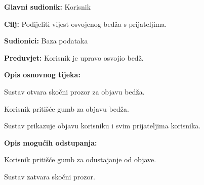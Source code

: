 				\noindent {}
		\begin{packed_item}
			
			\item \textbf{Glavni sudionik: } Korisnik
			\item  \textbf{Cilj:} Podijeliti vijest osvojenog bedža s prijateljima.
			\item  \textbf{Sudionici:} Baza podataka	%
			\item  \textbf{Preduvjet:} Korisnik je upravo osvojio bedž.
			\item  \textbf{Opis osnovnog tijeka:}
			
			\item[] \begin{packed_enum}
				
				\item Sustav otvara skočni prozor za objavu bedža.
				\item Korisnik pritišće gumb za objavu bedža.
				\item Sustav prikazuje objavu korisniku i svim prijateljima korisnika.
				
			\end{packed_enum}
			
			\item  \textbf{Opis mogućih odstupanja:}
			
			\item[] \begin{packed_item}
				
				\item[2.a] Korisnik pritišće gumb za odustajanje od objave.
				\item[] \begin{packed_enum}
					
					\item Sustav zatvara skočni prozor.
					
				\end{packed_enum}
				
			\end{packed_item}
		\end{packed_item}
	
